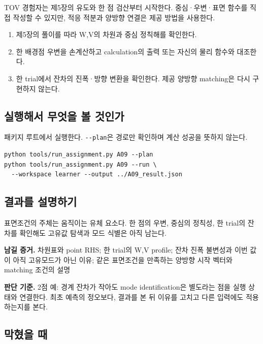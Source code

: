 \documentclass[
  10pt,
  a4paper,
]{article}
\providecommand{\tightlist}{%
  \setlength{\itemsep}{0pt}\setlength{\parskip}{0pt}}
\begin{document}
TOV 경험자는 제5장의 유도와 한 점 검산부터 시작한다. 중심·우변·표면
함수를 직접 작성할 수 있지만, 적응 적분과 양방향 연결은 제공 방법을
사용한다.

\begin{enumerate}
\def\labelenumi{\arabic{enumi}.}
\tightlist
\item
  제5장의 풀이를 따라 W,V의 차원과 중심 정칙해를 확인한다.
\item
  한 배경점 우변을 손계산하고 calculation의 출력 또는 자신의 물리 함수와
  대조한다.
\item
  한 trial에서 잔차의 진폭·방향 변환을 확인한다. 제공 양방향 matching은
  다시 구현하지 않는다.
\end{enumerate}

\newpage

\subsection{실행해서 무엇을 볼
것인가}\label{uxc2e4uxd589uxd574uxc11c-uxbb34uxc5c7uxc744-uxbcfc-uxac83uxc778uxac00}

패키지 루트에서 실행한다. \texttt{-\/-plan}은 경로만 확인하며 계산
성공을 뜻하지 않는다.

\begin{verbatim}
python tools/run_assignment.py A09 --plan
python tools/run_assignment.py A09 --run \
  --workspace learner --output ../A09_result.json
\end{verbatim}

\subsection{결과를
설명하기}\label{uxacb0uxacfcuxb97c-uxc124uxba85uxd558uxae30}

표면조건의 주체는 움직이는 유체 요소다. 한 점의 우변, 중심의 정칙성, 한
trial의 잔차를 확인해도 고유값 탐색과 모드 식별은 아직 남는다.

\textbf{남길 증거.} 차원표와 point RHS; 한 trial의 W,V profile; 잔차
진폭 불변성과 이번 값이 아직 고유모드가 아닌 이유; 같은 표면조건을
만족하는 양방향 시작 벡터와 matching 조건의 설명

\textbf{판단 기준.} 2점 예: 경계 잔차가 작아도 mode identification은
별도라는 점을 실행 상태와 연결한다. 최초 예측의 정오보다, 결과를 본 뒤
이유를 고치고 다른 입력에도 적용하는지를 본다.

\subsection{막혔을 때}\label{uxb9c9uxd614uxc744-uxb54c}
\end{document}
